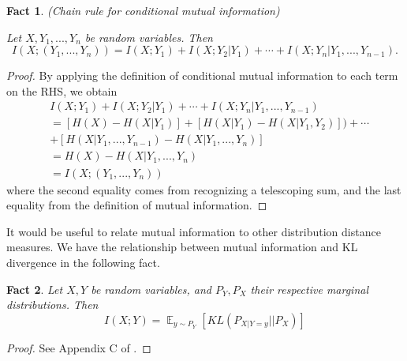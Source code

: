 \documentclass[11pt]{article}
\newtheorem{fact}{Fact}
\DeclareMathOperator*{\E}{\mathbb{E}}
\begin{document}
\begin{fact}\label{chain_rule}
(Chain rule for conditional mutual information)

Let $X, Y_1, ..., Y_n$ be random variables. Then
\begin{equation*}
    I(X;(Y_1, ..., Y_n)) = I(X;Y_1) + I(X;Y_2|Y_1) + \cdots + I(X;Y_n|Y_1, ..., Y_{n-1}).
\end{equation*}
\end{fact}
\begin{proof}
By applying the definition of conditional mutual information to each term on the RHS, we obtain
\begin{align*}
    & I(X;Y_1) + I(X;Y_2|Y_1) + \cdots + I(X;Y_n|Y_1, ..., Y_{n-1}) \\
    & = [H(X) - H(X|Y_1)] + [H(X|Y_1) - H(X|Y_1, Y_2)]) + \cdots \\ 
    & + [H(X|Y_1, ..., Y_{n-1}) - H(X|Y_1, ..., Y_n)] \\
    & = H(X) - H(X|Y_1, ..., Y_n) \\
    & = I(X;(Y_1, ..., Y_n))
\end{align*}
where the second equality comes from recognizing a telescoping sum, and the last equality from the definition of mutual information.
\end{proof}

It would be useful to relate mutual information to other distribution distance measures. We have the relationship between mutual information and KL divergence in the following fact.
\begin{fact}\label{mi_kl}
Let $X,Y$ be random variables, and $P_Y, P_X$ their respective marginal distributions. Then
\begin{equation*}
    I(X;Y) = \E_{y \sim P_Y} [KL(P_{X|Y = y} || P_X)]
\end{equation*}
\end{fact}
\begin{proof}
See  Appendix C of \cite{RussoRoy}.
\end{proof}
\end{document}
